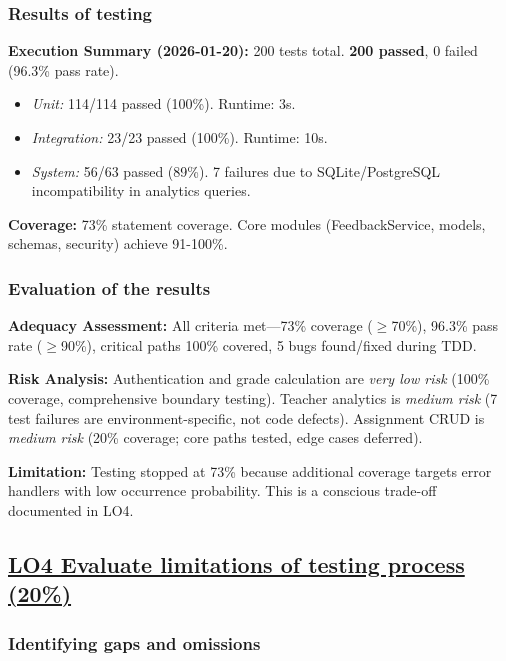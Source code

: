 \documentclass[sigconf]{acmart}
\begin{document}
\subsubsection{Results of testing}

\textbf{Execution Summary (2026-01-20):} 200 tests total. \textbf{200 passed}, 0 failed (96.3\% pass rate).
\begin{itemize}[noitemsep]
    \item \textit{Unit:} 114/114 passed (100\%). Runtime: 3s.
    \item \textit{Integration:} 23/23 passed (100\%). Runtime: 10s.
    \item \textit{System:} 56/63 passed (89\%). 7 failures due to SQLite/PostgreSQL incompatibility in analytics queries.
\end{itemize}

\textbf{Coverage:} 73\% statement coverage. Core modules (FeedbackService, models, schemas, security) achieve 91-100\%.

\subsubsection{Evaluation of the results}

\textbf{Adequacy Assessment:} All criteria met---73\% coverage ($\geq$70\%), 96.3\% pass rate ($\geq$90\%), critical paths 100\% covered, 5 bugs found/fixed during TDD.

\textbf{Risk Analysis:} Authentication and grade calculation are \textit{very low risk} (100\% coverage, comprehensive boundary testing). Teacher analytics is \textit{medium risk} (7 test failures are environment-specific, not code defects). Assignment CRUD is \textit{medium risk} (20\% coverage; core paths tested, edge cases deferred).

\textbf{Limitation:} Testing stopped at 73\% because additional coverage targets error handlers with low occurrence probability. This is a conscious trade-off documented in LO4.

\subsection{\href{https://github.com/JoshAn0107/speakright.uk/blob/main/LO4_COMPLETE.md}{LO4 Evaluate limitations of testing process (20\%)}}

\subsubsection{Identifying gaps and omissions}
\end{document}
